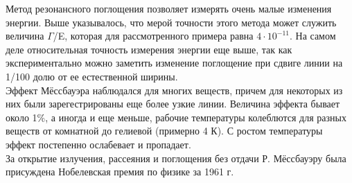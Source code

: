 \documentclass{article}
\begin{document}
\indent Метод резонансного поглощения позволяет измерять очень малые изменения энергии. Выше указывалось, что мерой точности этого метода может служить величина $\Gamma$/E, которая для рассмотренного примера равна $4\cdot10^{-11}$. На самом деле относительная точность измерения энергии еще выше, так как экспериментально можно заметить изменение поглощение при сдвиге линии на 1/100 долю от ее естественной ширины.
\\
\indent Эффект Мёссбауэра наблюдался для многих веществ, причем для некоторых из них были зарегестрированы еще более узкие линии. Величина эффекта бывает около 1$\%$, а иногда и еще меньше, рабочие температуры колеблются для разных веществ от комнатной до гелиевой (примерно 4 К). С ростом температуры эффект постепенно ослабевает и пропадает.
\\
\indent За открытие излучения, рассеяния и поглощения без отдачи Р. Мёссбауэру была присуждена Нобелевская премия по физике за 1961 г.
\end{document}
